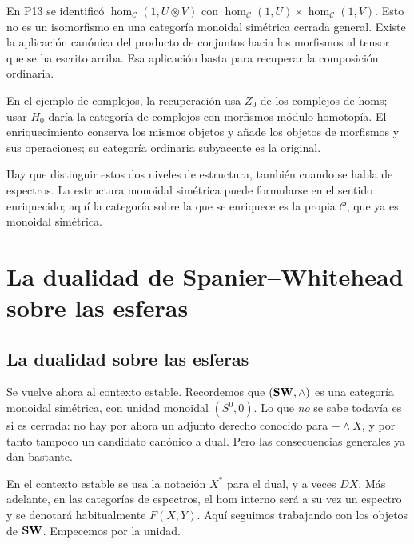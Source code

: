 \begin{nota}
En P13 se identificó $\hom_{\mathcal C}(1,U\otimes V)$ con
$\hom_{\mathcal C}(1,U)\times\hom_{\mathcal C}(1,V)$.
Esto no es un isomorfismo en una categoría monoidal simétrica cerrada general. Existe la aplicación canónica del producto de conjuntos hacia los morfismos al tensor que se ha escrito arriba. Esa aplicación basta para recuperar la composición ordinaria.
\end{nota}

\begin{nota}
En el ejemplo de complejos, la recuperación usa $Z_0$ de los complejos de homs; usar $H_0$ daría la categoría de complejos con morfismos módulo homotopía. El enriquecimiento conserva los mismos objetos y añade los objetos de morfismos y sus operaciones; su categoría ordinaria subyacente es la original.

Hay que distinguir estos dos niveles de estructura, también cuando se habla de espectros. La estructura monoidal simétrica puede formularse en el sentido enriquecido; aquí la categoría sobre la que se enriquece es la propia $\mathcal C$, que ya es monoidal simétrica.
\end{nota}


\section{La dualidad de Spanier--Whitehead sobre las esferas}

\subsection{La dualidad sobre las esferas}

Se vuelve ahora al contexto estable. Recordemos que $(\mathbf{SW},\wedge)$ es una categoría monoidal simétrica, con unidad monoidal $(S^0,0)$. Lo que \emph{no} se sabe todavía es si es cerrada: no hay por ahora un adjunto derecho conocido para $-\wedge X$, y por tanto tampoco un candidato canónico a dual. Pero las consecuencias generales ya dan bastante.

En el contexto estable se usa la notación $X^*$ para el dual, y a veces $DX$. Más adelante, en las categorías de espectros, el hom interno será a su vez un espectro y se denotará habitualmente $F(X,Y)$. Aquí seguimos trabajando con los objetos de $\mathbf{SW}$. Empecemos por la unidad.

